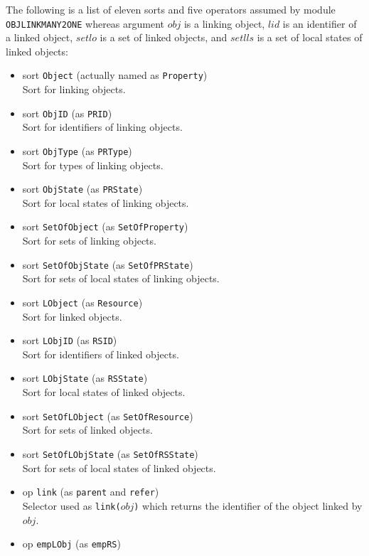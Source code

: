 \documentclass[12pt]{report}
\newcommand{\stt}[1]{{\small{\tt {#1}}}}
\begin{document}
The following is a list of eleven sorts and five operators assumed by
module {\tt OBJLINKMANY2ONE} whereas argument $obj$ is a linking
object, $lid$ is an identifier of a linked object, $setlo$ is a set of
linked objects, and $setlls$ is a set of local states of linked
objects:
\begin{itemize}
\item sort \stt{Object} (actually named as \stt{Property})\\
  Sort for linking objects.
\item sort \stt{ObjID} (as \stt{PRID})\\
  Sort for identifiers of linking objects.
\item sort \stt{ObjType} (as \stt{PRType})\\
  Sort for types of linking objects.
\item sort \stt{ObjState} (as \stt{PRState})\\
  Sort for local states of linking objects.
\item sort \stt{SetOfObject} (as \stt{SetOfProperty})\\
  Sort for sets of linking objects.
\item sort \stt{SetOfObjState} (as \stt{SetOfPRState})\\
  Sort for sets of local states of linking objects.
\item sort \stt{LObject} (as \stt{Resource})\\
  Sort for linked objects.
\item sort \stt{LObjID} (as \stt{RSID})\\
  Sort for identifiers of linked objects.
\item sort \stt{LObjState} (as \stt{RSState})\\
  Sort for local states of linked objects.
\item sort \stt{SetOfLObject} (as \stt{SetOfResource})\\
  Sort for sets of linked objects.
\item sort \stt{SetOfLObjState} (as \stt{SetOfRSState})\\
  Sort for sets of local states of linked objects.
\item op \stt{link} (as \stt{parent} and \stt{refer})\\
  Selector used as \stt{link($obj$)} which returns the identifier of
  the object linked by $obj$.
\item op \stt{empLObj} (as \stt{empRS})\\

\end{itemize}
\end{document}
